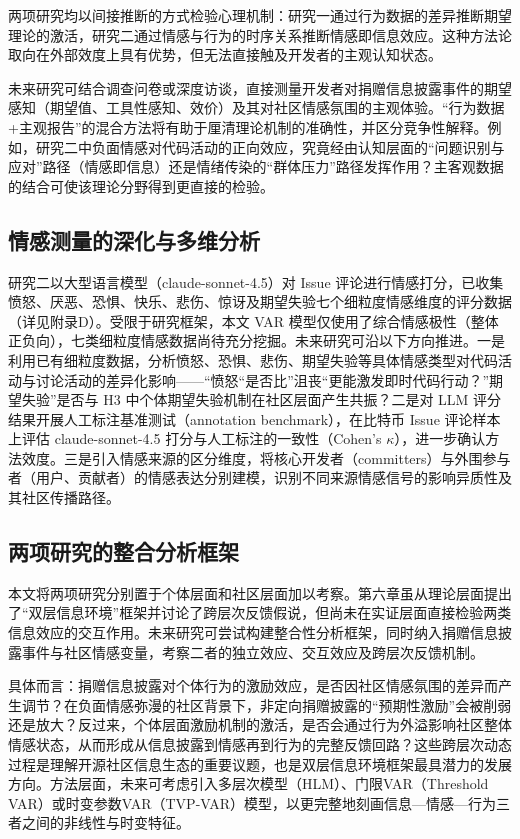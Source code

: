 两项研究均以间接推断的方式检验心理机制：研究一通过行为数据的差异推断期望理论的激活，研究二通过情感与行为的时序关系推断情感即信息效应。这种方法论取向在外部效度上具有优势，但无法直接触及开发者的主观认知状态。

未来研究可结合调查问卷或深度访谈，直接测量开发者对捐赠信息披露事件的期望感知（期望值、工具性感知、效价）及其对社区情感氛围的主观体验。“行为数据+主观报告”的混合方法将有助于厘清理论机制的准确性，并区分竞争性解释。例如，研究二中负面情感对代码活动的正向效应，究竟经由认知层面的“问题识别与应对”路径（情感即信息）还是情绪传染的“群体压力”路径发挥作用？主客观数据的结合可使该理论分野得到更直接的检验。

\subsection{情感测量的深化与多维分析}

研究二以大型语言模型（claude-sonnet-4.5）对 Issue 评论进行情感打分，已收集愤怒、厌恶、恐惧、快乐、悲伤、惊讶及期望失验七个细粒度情感维度的评分数据（详见附录D）。受限于研究框架，本文 VAR 模型仅使用了综合情感极性（整体正负向），七类细粒度情感数据尚待充分挖掘。未来研究可沿以下方向推进。一是利用已有细粒度数据，分析愤怒、恐惧、悲伤、期望失验等具体情感类型对代码活动与讨论活动的差异化影响——“愤怒“是否比”沮丧“更能激发即时代码行动？”期望失验”是否与 H3 中个体期望失验机制在社区层面产生共振？二是对 LLM 评分结果开展人工标注基准测试（annotation benchmark），在比特币 Issue 评论样本上评估 claude-sonnet-4.5 打分与人工标注的一致性（Cohen's $\kappa$），进一步确认方法效度。三是引入情感来源的区分维度，将核心开发者（committers）与外围参与者（用户、贡献者）的情感表达分别建模，识别不同来源情感信号的影响异质性及其社区传播路径。

\subsection{两项研究的整合分析框架}

本文将两项研究分别置于个体层面和社区层面加以考察。第六章虽从理论层面提出了“双层信息环境”框架并讨论了跨层次反馈假说，但尚未在实证层面直接检验两类信息效应的交互作用。未来研究可尝试构建整合性分析框架，同时纳入捐赠信息披露事件与社区情感变量，考察二者的独立效应、交互效应及跨层次反馈机制。

具体而言：捐赠信息披露对个体行为的激励效应，是否因社区情感氛围的差异而产生调节？在负面情感弥漫的社区背景下，非定向捐赠披露的“预期性激励”会被削弱还是放大？反过来，个体层面激励机制的激活，是否会通过行为外溢影响社区整体情感状态，从而形成从信息披露到情感再到行为的完整反馈回路？这些跨层次动态过程是理解开源社区信息生态的重要议题，也是双层信息环境框架最具潜力的发展方向。方法层面，未来可考虑引入多层次模型（HLM）、门限VAR（Threshold VAR）或时变参数VAR（TVP-VAR）模型，以更完整地刻画信息—情感—行为三者之间的非线性与时变特征。


